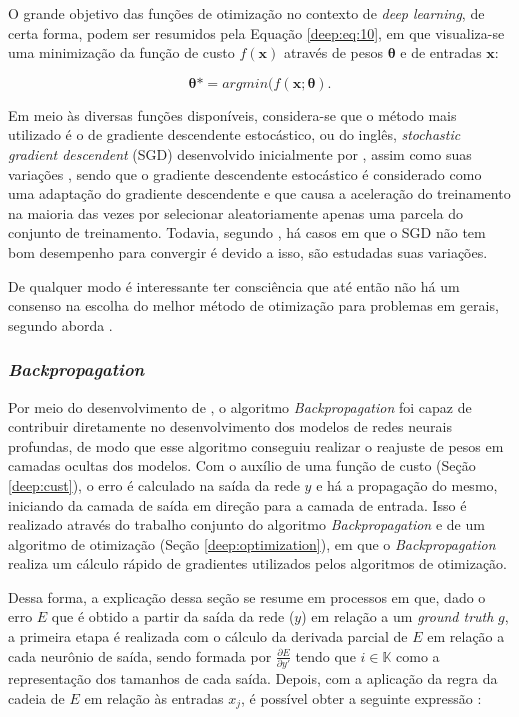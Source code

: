 O grande objetivo das funções de otimização no contexto de \textit{deep learning}, de certa forma, podem ser resumidos pela Equação \ref{deep:eq:10}, em que visualiza-se uma minimização da função de custo $f(\boldsymbol{x})$ através de pesos $\boldsymbol{\theta}$ e de entradas $\boldsymbol{x}$:

\begin{equation}
    \label{deep:eq:10}
    \boldsymbol{\theta}* = argmin(f(\boldsymbol{x};\boldsymbol{\theta}).
\end{equation}

Em meio às diversas funções disponíveis, considera-se que o método mais utilizado é o de gradiente descendente estocástico, ou do inglês, \textit{stochastic gradient descendent} (SGD) desenvolvido inicialmente por \cite{cauchy1847methode}, assim como suas variações \cite{Goodfellow2016}, sendo que o gradiente descendente estocástico é considerado como uma adaptação do gradiente descendente e que causa a aceleração do treinamento na maioria das vezes por selecionar aleatoriamente apenas uma parcela do conjunto de treinamento. Todavia, segundo \cite{Goodfellow2016}, há casos em que o SGD não tem bom desempenho para convergir é devido a isso, são estudadas suas variações.

De qualquer modo é interessante ter consciência que até então não há um consenso na escolha do melhor método de otimização para problemas em gerais, segundo aborda \cite{Goodfellow2016}.

\subsubsection{\textit{Backpropagation}}
\label{deep:backprop}

Por meio do desenvolvimento de \cite{rumelhart1986learning}, o algoritmo \textit{Backpropagation} foi capaz de contribuir diretamente no desenvolvimento dos modelos de redes neurais profundas, de modo que esse algoritmo conseguiu realizar o reajuste de pesos em camadas ocultas dos modelos. Com o auxílio de uma função de custo (Seção
\ref{deep:cust}), o erro é calculado na saída da rede $y$ e há a propagação do mesmo, iniciando da camada de saída em direção para a camada de entrada. Isso é realizado através do trabalho conjunto do algoritmo \textit{Backpropagation} e de um algoritmo de otimização (Seção \ref{deep:optimization}), em que o \textit{Backpropagation} realiza um cálculo rápido de gradientes utilizados pelos algoritmos de otimização.

Dessa forma, a explicação dessa seção se resume em processos em que, dado o erro $E$ que é obtido a partir da saída da rede ($y$) em relação a um \textit{ground truth} $g$, a primeira etapa é realizada com o cálculo da derivada parcial de $E$ em relação a cada neurônio de saída, sendo formada por $\frac{\partial E}{\partial y'}$ tendo que $i \in \mathbb{K}$ como a representação dos tamanhos de cada saída. Depois, com a aplicação da regra da cadeia de $E$ em relação às entradas $x_j$, é possível obter a seguinte expressão \cite{rumelhart1986learning}:

